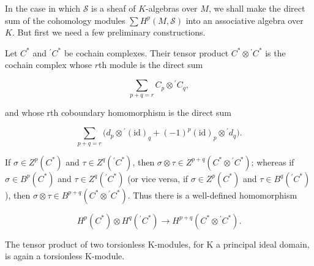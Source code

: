 In the case in which $\mathcal{S}$ is a sheaf of $K$-algebras over $M$, we shall make the direct sum of the cohomology modules $\sum H^{p}(M,\mathcal{S})$ into an associative algebra over $K$. But first we need a few preliminary constructions.

\begin{definition}\label{thm:5.39}
Let $C^*$ and ${}^{\prime}C^*$ be cochain complexes. Their tensor product $C^* \otimes {}^{\prime}C^*$ is the cochain complex whose $r$th module is the direct sum

\begin{equation}
\tag{1}\label{eq:5.39:1}
\sum_{p+q=r}C_{p}\otimes{}^{\prime}C_{q},
\end{equation}

and whose rth coboundary homomorphism is the direct sum

\begin{equation}
\tag{2}\label{eq:5.39:2}
\sum_{p+q=r}\big(d_{p}\otimes{}^{\prime}(\mathrm{id})_{q}+(-1)^{p}(\mathrm{id})_{p}\otimes{}^{\prime}d_{q}\big).
\end{equation}

If $\sigma \in Z^p(C^*)$ and $\tau \in Z^q({}^{\prime}C^*)$, then $\sigma \otimes \tau \in Z^{p+q}(C^* \otimes{}^{\prime}C^*)$; whereas if $\sigma \in B^p(C^*)$ and $\tau \in Z^q({}^{\prime}C^*)$ (or vice versa, if $\sigma \in Z^p(C^*)$ and $\tau \in B^q({}^{\prime}C^*)$), then $\sigma \otimes \tau \in B^{p+q}(C^* \otimes{}^{\prime}C^*)$. Thus there is a well-defined homomorphism

\begin{equation}
\tag{3}\label{eq:5.39:3}
H^{p}(C^{*})\otimes H^{q}({}^{\prime}C^{*})\to H^{p+q}(C^{*}\otimes{}^{\prime}C^{*}).
\end{equation}

\end{definition}

\begin{lemma}\label{thm:5.40}
The tensor product of two torsionless K-modules, for K a principal ideal domain, is again a torsionless K-module.

\end{lemma}

